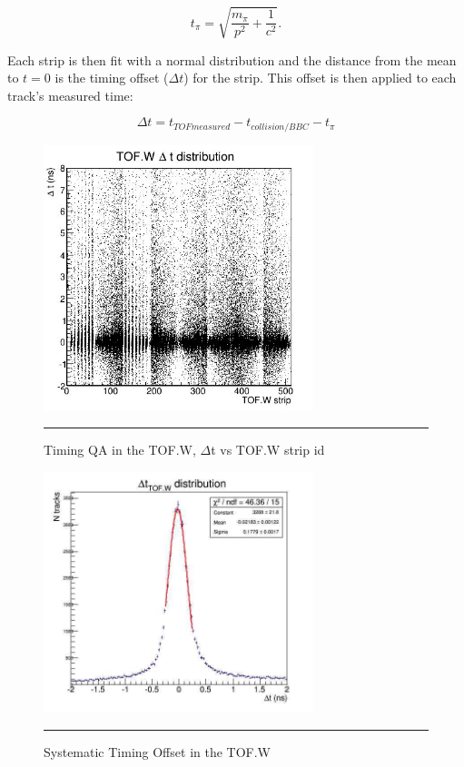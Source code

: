 \begin{equation}
t_{\pi} = \sqrt{\frac{m_{\pi}}{p^2} + \frac{1}{c^2}}.
\end{equation}

Each strip is then fit with a normal distribution and the distance from the mean to $t=0$ is the timing offset ($\Delta t$) for the strip. This offset is then applied to each track's measured time:

\begin{equation}
\Delta t = t_{TOF measured} - t_{collision/BBC} - t_{\pi} 
\end{equation}
 
\begin{figure}[htbp]
  \centering
    \includegraphics[width=0.7\textwidth]{evtQA/ttofwdist.JPG}
    \rule{35em}{0.5pt}
  \caption[Timing QA in the TOF.W]{Timing QA in the TOF.W, $\Delta$t vs TOF.W strip id}
  \label{fig:tofwdist}
\end{figure}

\begin{figure}[htbp]
  \centering
    \includegraphics[width=0.7\textwidth]{evtQA/deltattofwdist.jpg}
    \rule{35em}{0.5pt}
  \caption[Systematic Offset in TOF.W]{Systematic Timing Offset in the TOF.W}
  \label{fig:tofwsyst}
\end{figure}

